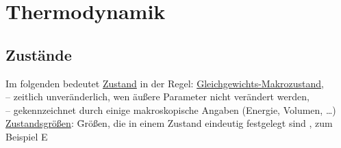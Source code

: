 \section{Thermodynamik}
\subsection{Zustände}
\begin{tabbing}
Im folgenden bedeutet \uline{Zustand} in der Regel: \uline{Gleichgewichts-Makrozustand},\\
-- zeitlich unveränderlich, wen äußere Parameter nicht verändert werden,\\
-- gekennzeichnet durch einige makroskopische Angaben (Energie, Volumen, \dots)\\
\uline{Zustandsgrößen}: \= Größen, die in einem Zustand eindeutig festgelegt sind , zum Beispiel E
\end{tabbing}
